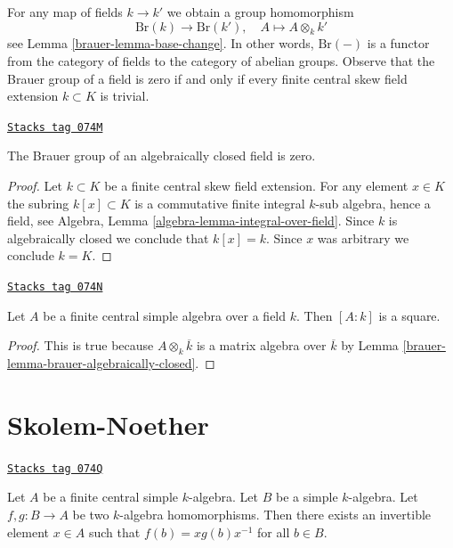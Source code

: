 For any map of fields $k \to k'$ we obtain a group homomorphism
$$
\text{Br}(k) \longrightarrow \text{Br}(k'),\quad
A \longmapsto A \otimes_k k'
$$
see Lemma \ref{brauer-lemma-base-change}. In other words, $\text{Br}(-)$ is
a functor from the category of fields to the category of abelian groups.
Observe that the Brauer group
of a field is zero if and only if every finite central skew field
extension $k \subset K$ is trivial.

\begin{lemma}
\label{brauer-lemma-brauer-algebraically-closed}
\href{https://stacks.math.columbia.edu/tag/074M}{\texttt{Stacks tag 074M}}

The Brauer group of an algebraically closed field is zero.
\end{lemma}

\begin{proof}
Let $k \subset K$ be a finite central skew field extension.
For any element $x \in K$ the subring $k[x] \subset K$ is a
commutative finite integral $k$-sub algebra, hence a field, see
Algebra, Lemma \ref{algebra-lemma-integral-over-field}.
Since $k$ is algebraically closed we conclude that
$k[x] = k$. Since $x$ was arbitrary we conclude $k = K$.
\end{proof}

\begin{lemma}
\label{brauer-lemma-dimension-square}
\href{https://stacks.math.columbia.edu/tag/074N}{\texttt{Stacks tag 074N}}

Let $A$ be a finite central simple algebra over a field $k$.
Then $[A : k]$ is a square.
\end{lemma}

\begin{proof}

This is true because $A \otimes_k \overline{k}$ is a matrix
algebra over $\overline{k}$ by
Lemma \ref{brauer-lemma-brauer-algebraically-closed}.
\end{proof}

\section{Skolem-Noether}
\label{brauer-section-skolem-noether}
\begin{theorem}
\label{brauer-theorem-skolem-noether}
\href{https://stacks.math.columbia.edu/tag/074Q}{\texttt{Stacks tag 074Q}}

Let $A$ be a finite central simple $k$-algebra. Let $B$ be a simple
$k$-algebra. Let $f, g : B \to A$ be two $k$-algebra homomorphisms.
Then there exists an invertible element $x \in A$ such that
$f(b) = xg(b)x^{-1}$ for all $b \in B$.
\end{theorem}

